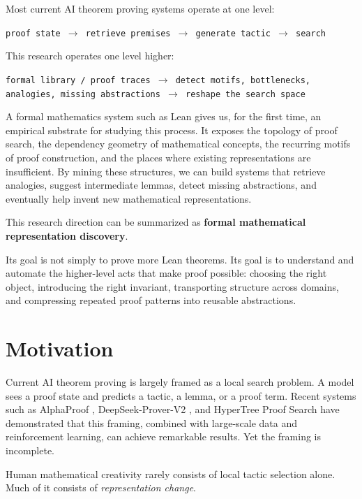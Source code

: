 \documentclass[12pt, a4paper]{article}
\begin{document}
Most current AI theorem proving systems operate at one level:
\begin{center}
\texttt{proof state $\to$ retrieve premises $\to$ generate tactic $\to$ search}
\end{center}
This research operates one level higher:
\begin{center}
\texttt{formal library / proof traces $\to$ detect motifs, bottlenecks,}\\
\texttt{analogies, missing abstractions $\to$ reshape the search space}
\end{center}

A formal mathematics system such as Lean gives us, for the first time, an
empirical substrate for studying this process. It exposes the topology of
proof search, the dependency geometry of mathematical concepts, the recurring
motifs of proof construction, and the places where existing representations
are insufficient. By mining these structures, we can build systems that
retrieve analogies, suggest intermediate lemmas, detect missing abstractions,
and eventually help invent new mathematical representations.

This research direction can be summarized as \textbf{formal mathematical
representation discovery}.

Its goal is not simply to prove more Lean theorems. Its goal is to
understand and automate the higher-level acts that make proof possible:
choosing the right object, introducing the right invariant, transporting
structure across domains, and compressing repeated proof patterns into
reusable abstractions.

\section{Motivation}

Current AI theorem proving is largely framed as a local search problem. A
model sees a proof state and predicts a tactic, a lemma, or a proof term.
Recent systems such as AlphaProof \citep{alphaproof2025},
DeepSeek-Prover-V2 \citep{deepseekproverv2}, and HyperTree Proof Search
\citep{lample2022hypertree} have demonstrated that this framing, combined
with large-scale data and reinforcement learning, can achieve remarkable
results. Yet the framing is incomplete.

Human mathematical creativity rarely consists of local tactic selection
alone. Much of it consists of \emph{representation change}.
\end{document}
